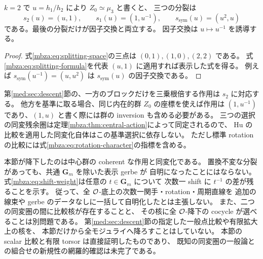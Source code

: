 \begin{corollary}[二ブロックの対称な選択]
\label{mbza:cor:two-block}
$k=2$ で $u=h_1/h_2$ により $Z_0\simeq\mu_3$ と書くと、
三つの分裂は
\[
 s_2(u)=(u,1),\qquad
 s_1(u)=(1,u^{-1}),\qquad
 s_{\mathrm{sym}}(u)=(u^2,u)
\]
である。最後の分裂だけが因子交換と両立する。
因子交換は $u\mapsto u^{-1}$ を誘導する。
\end{corollary}
\begin{proof}
式\eqref{mbza:eq:splitting-space}の三点は $(0,1),(1,0),(2,2)$ である。
式\eqref{mbza:eq:splitting-formula}を代表 $(u,1)$ に適用すれば表示した式を得る。
例えば $s_{\mathrm{sym}}(u^{-1})=(u,u^2)$ は $s_{\mathrm{sym}}(u)$ の因子交換である。
\end{proof}

第\ref{med:sec:descent}節の、一方のブロックだけを三乗根倍する作用は $s_2$ に対応する。
他方を基準に取る場合、同じ内在的群 $Z_0$ の座標を使えば作用は
$(1,u^{-1})$ であり、$(1,u)$ と書く際には群の inversion も含める必要がある。
三つの選択の同変残余圏は定理\ref{mbza:thm:central-action}によって同定されるので、
Hu の比較を適用した同変化自体はこの基準選択に依存しない。
ただし標準 rotation の比較には式\eqref{mbza:eq:rotation-character}の指標を含める。

\begin{remark}
\label{mbza:rem:scope}
本節が降下したのは中心群の coherent な作用と同変化である。
置換不変な分裂があっても、共通 $\mathbf G_m$ を除いた表示 gerbe が
自明になったことにはならない。
式\eqref{mbza:eq:shift-weight}は任意の $t\in\mathbf G_m$ について
次数一 shift に $t^{-1}$ の差が残ることを示す。
従って、全 $\mathcal O$-底上の次数一関手・rotation・周期直線を
追加の線束や gerbe のデータなしに一括して自明化したとは主張しない。
また、二つの同変圏の間に比較核が存在することと、
その核に全 $\mathcal O$-降下の cocycle が選べることは別問題である。
第\ref{med:sec:descent}節の指定した一般点比較や有限拡大上の核を、
本節だけから全モジュライへ降ろすことはしていない。
本節の scalar 比較と有限 torsor は直接証明したものであり、
既知の同変圏の一般論との組合せの新規性の網羅的確認は未完了である。
\end{remark}
